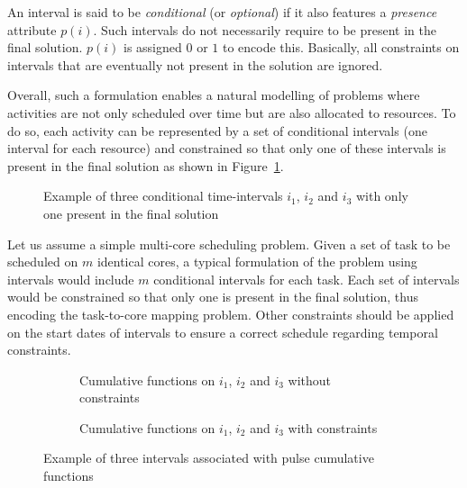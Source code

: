 \documentclass[main.tex]{subfiles}
\begin{document}
An interval is said to be \emph{conditional} (or \emph{optional}) if it also features a \emph{presence} attribute $p(i)$. Such intervals do not necessarily require to be present in the final solution. $p(i)$ is assigned $0$ or $1$ to encode this. Basically, all constraints on intervals that are eventually not present in the solution are ignored. 

Overall, such a formulation enables a natural modelling of problems where activities are not only scheduled over time but are also allocated to resources. To do so, each activity can be represented by a set of conditional intervals (one interval for each resource) and constrained so that only one of these intervals is present in the final solution as shown in Figure~\ref{fig_validation_condTimeInterval}. 

\begin{figure}
    \centering
    \scalebox{0.8}{}
    \caption{Example of three conditional time-intervals $i_1$, $i_2$ and $i_3$ with only one present in the final solution}
    \label{fig_validation_condTimeInterval}
\end{figure}

\begin{example}
    Let us assume a simple multi-core scheduling problem. Given a set of task to be scheduled on $m$ identical cores, a typical formulation of the problem using intervals would include $m$ conditional intervals for each task. Each set of intervals would be constrained so that only one is present in the final solution, thus encoding the task-to-core mapping problem. Other constraints should be applied on the start dates of intervals to ensure a correct schedule regarding temporal constraints. 
\end{example}

\begin{figure}
    \centering
    \begin{subfigure}[b]{\linewidth}
        \centering
        \scalebox{0.9}{}
        \caption{Cumulative functions on $i_1$, $i_2$ and $i_3$ without constraints}
        \label{fig_validation_pulseFunctionNoConst}
    \end{subfigure}\vspace{5mm}
    \begin{subfigure}[b]{\linewidth}
        \centering
        \scalebox{0.9}{}
        \caption{Cumulative functions on $i_1$, $i_2$ and $i_3$ with constraints}
        \label{fig_validation_pulseFunctionWithConst}
    \end{subfigure}
    \caption{Example of three intervals associated with pulse cumulative functions}
    \label{fig_validation_pulseFunction}
\end{figure}
\end{document}
